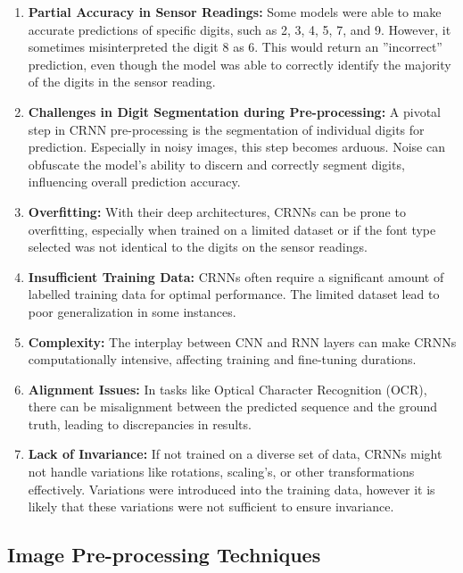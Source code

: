 \begin{enumerate}
    \item \textbf{Partial Accuracy in Sensor Readings:} Some models were able to make accurate predictions of specific digits, such as 2, 3, 4, 5, 7, and 9. However, it sometimes misinterpreted the digit 8 as 6. This would return an ''incorrect'' prediction, even though the model was able to correctly identify the majority of the digits in the sensor reading.

    \item \textbf{Challenges in Digit Segmentation during Pre-processing:} A pivotal step in CRNN pre-processing is the segmentation of individual digits for prediction. Especially in noisy images, this step becomes arduous. Noise can obfuscate the model's ability to discern and correctly segment digits, influencing overall prediction accuracy.

    \item \textbf{Overfitting:} With their deep architectures, CRNNs can be prone to overfitting, especially when trained on a limited dataset or if the font type selected was not identical to the digits on the sensor readings.

    \item \textbf{Insufficient Training Data:} CRNNs often require a significant amount of labelled training data for optimal performance. The limited dataset lead to poor generalization in some instances.

    \item \textbf{Complexity:} The interplay between CNN and RNN layers can make CRNNs computationally intensive, affecting training and fine-tuning durations.


    \item \textbf{Alignment Issues:} In tasks like Optical Character Recognition (OCR), there can be misalignment between the predicted sequence and the ground truth, leading to discrepancies in results.

    \item \textbf{Lack of Invariance:} If not trained on a diverse set of data, CRNNs might not handle variations like rotations, scaling's, or other transformations effectively. Variations were introduced into the training data, however it is likely that these variations were not sufficient to ensure invariance.

\end{enumerate}

\subsection{Image Pre-processing Techniques}

